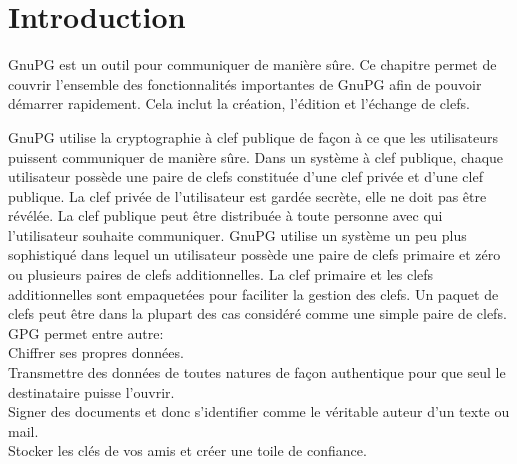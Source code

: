 \section{Introduction}

GnuPG est un outil pour communiquer de manière sûre. Ce chapitre permet de couvrir l'ensemble des fonctionnalités 
importantes de GnuPG afin de pouvoir démarrer rapidement. Cela inclut la création, l'édition et l'échange de clefs.

GnuPG utilise la cryptographie à clef publique de façon à ce que les utilisateurs puissent communiquer de manière sûre. 
Dans un système à clef publique, chaque utilisateur possède une paire de clefs constituée d'une clef privée et d'une clef publique. 
La clef privée de l'utilisateur est gardée secrète, elle ne doit pas être révélée. La clef publique peut être distribuée à toute personne
avec qui l'utilisateur souhaite communiquer. GnuPG utilise un système un peu plus sophistiqué dans lequel un utilisateur possède 
une paire de clefs primaire et zéro ou plusieurs paires de clefs additionnelles. La clef primaire et les clefs additionnelles sont 
empaquetées pour faciliter la gestion des clefs. Un paquet de clefs peut être dans la plupart des cas considéré comme une simple paire 
de clefs.\\

GPG permet entre autre: \\
Chiffrer ses propres données.\\
Transmettre des données de toutes natures de façon authentique pour que seul le destinataire puisse l'ouvrir.\\
Signer des documents et donc s'identifier comme le véritable auteur d'un texte ou mail.\\
Stocker les clés de vos amis et créer une toile de confiance.

